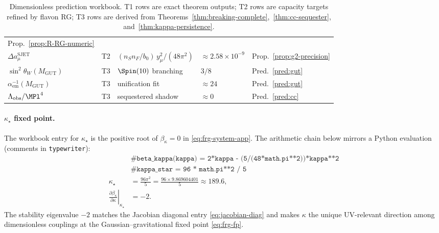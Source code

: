 \begin{table}[ht]
\begin{tabular}{@{}lllll@{}}
Prop.~\ref{prop:R-RG-numeric} \\
$\Delta a_\mu^{\mathrm{SJET}}$ & T2 &
$(n_S n_F/b_0)\,y_\mu^2/(48\pi^2)$ &
$\approx 2.58\times10^{-9}$ &
Prop.~\ref{prop:g2-precision} \\
$\sin^2\theta_W(M_{\mathrm{GUT}})$ & T3 & $\Spin(10)$ branching & $3/8$ &
Pred.~\ref{pred:gut} \\
$\alpha_{\mathrm{em}}^{-1}(M_{\mathrm{GUT}})$ & T3 & unification fit &
$\approx 24$ &
Pred.~\ref{pred:gut} \\
$\Lambda_{\mathrm{obs}}/\MPl^4$ & T3 & sequestered shadow &
$\approx 0$ &
Pred.~\ref{pred:cc} \\
\bottomrule
\end{tabular}
\caption{Dimensionless prediction workbook. T1 rows are exact theorem outputs;
T2 rows are capacity targets refined by flavon RG; T3 rows are derived from
Theorems~\ref{thm:breaking-complete},~\ref{thm:cc-sequester},
and~\ref{thm:kappa-persistence}.}
\label{tab:numerical-workbook}
\end{table}

\paragraph{$\kappa_\star$ fixed point.}
The workbook entry for $\kappa_\star$ is the positive root of
$\beta_\kappa=0$ in \eqref{eq:frg-system-app}. The arithmetic chain below
mirrors a Python evaluation (comments in \texttt{typewriter}):
\begin{equation}\label{eq:workbook-kappa}
\begin{aligned}
  &\texttt{\# beta\_kappa(kappa) = 2*kappa - (5/(48*math.pi**2))*kappa**2}\\
  &\texttt{\# kappa\_star = 96 * math.pi**2 / 5}\\
  \kappa_\star
  &= \frac{96\pi^2}{5}
  = \frac{96\times 9.869604401}{5}
  \approx 189.6,\\
  \left.\frac{\partial\beta_\kappa}{\partial\kappa}\right|_{\kappa_\star}
  &= -2.
\end{aligned}
\end{equation}
The stability eigenvalue $-2$ matches the Jacobian diagonal entry
\eqref{eq:jacobian-diag} and makes $\kappa$ the unique UV-relevant direction
among dimensionless couplings at the Gaussian--gravitational fixed point
\eqref{eq:frg-fp}.

